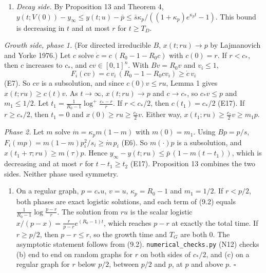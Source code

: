 \documentclass[
  11pt,
  a4paper,
]{article}
\providecommand{\tightlist}{%
  \setlength{\itemsep}{0pt}\setlength{\parskip}{0pt}}
\begin{document}
\begin{enumerate}
\def\labelenumi{(\alph{enumi})}
\setcounter{enumi}{1}
\tightlist
\item
  \emph{Decay side.} By Proposition 13 and Theorem 4,
  \(y(t;V(0))-y_\infty\le y(t;u)-\bar p\le\bar s\kappa_p/((1+\kappa_p)e^{\kappa_pt}-1)\).
  This bound is decreasing in \(t\) and at most \(r\) for \(t\ge T_D\).
\end{enumerate}

\emph{Growth side, phase 1.} (For directed irreducible \(B\),
\(x(t;ru)\to p\) by Lajmanovich and Yorke 1976.) Let \(c\) solve
\(\dot c=c\,(R_0-1-R_0c)\) with \(c(0)=r\). If \(r<c_*\), then \(c\)
increases to \(c_*\), and \(cv\in[0,1]^n\). With \(Bv=R_0v\) and
\(v_i\le1\), \[F_i(cv)=c\,v_i\,(R_0-1-R_0cv_i)\ge\dot c\,v_i\] (E7). So
\(cv\) is a subsolution, and since \(c(0)v\le ru\), Lemma 1 gives
\(x(t;ru)\ge c(t)v\). As \(t\to\infty\), \(x(t;ru)\to p\) and
\(c\to c_*\), so \(c_*v\le p\) and \(m_1\le1/2\). Let
\(t_1=\frac1{R_0-1}\log^+\frac{c_*-r}{r}\). If \(r<c_*/2\), then
\(c(t_1)=c_*/2\) (E17). If \(r\ge c_*/2\), then \(t_1=0\) and
\(x(0)\ge ru\ge\frac{c_*}{2}v\). Either way,
\(x(t_1;ru)\ge\frac{c_*}2v\ge m_1p\).

\emph{Phase 2.} Let \(m\) solve \(\dot m=\kappa_pm(1-m)\) with
\(m(0)=m_1\). Using \(Bp=p/s\),
\(F_i(mp)=m(1-m)p_i^2/s_i\ge\dot m\,p_i\) (E6). So \(m(\cdot)p\) is a
subsolution, and \(x(t_1+\tau;ru)\ge m(\tau)p\). Hence
\(y_\infty-y(t;ru)\le\bar p\,(1-m(t-t_1))\), which is decreasing and at
most \(r\) for \(t-t_1\ge t_2\) (E17). Proposition 13 combines the two
sides. Neither phase used symmetry.

\begin{enumerate}
\def\labelenumi{(\alph{enumi})}
\setcounter{enumi}{2}
\tightlist
\item
  On a regular graph, \(p=c_*u\), \(v=u\), \(\kappa_p=R_0-1\) and
  \(m_1=1/2\). If \(r<p/2\), both phases are exact logistic solutions,
  and each term of (9.2) equals \(\frac1{R_0-1}\log\frac{p-r}{r}\). The
  solution from \(ru\) is the scalar logistic
  \(x/(p-x)=\frac{r}{p-r}e^{(R_0-1)t}\), which reaches \(p-r\) at
  exactly the total time. If \(r\ge p/2\), then \(p-r\le r\), so the
  growth time and \(T_G\) are both \(0\). The asymptotic statement
  follows from (9.2). \texttt{numerical\_checks.py} (N12) checks (b) end
  to end on random graphs for \(r\) on both sides of \(c_*/2\), and (c)
  on a regular graph for \(r\) below \(p/2\), between \(p/2\) and \(p\),
  at \(p\) and above \(p\). \(\square\)
\end{enumerate}
\end{document}
